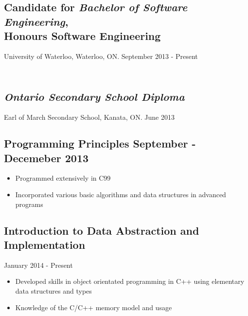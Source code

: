 \documentclass[11pt]{article}
\begin{document}
\begin{minipage}[t]{0.8\linewidth} 
	\subsection*{Candidate for \textit{Bachelor of Software Engineering}, \\ Honours Software Engineering} 								\vspace{-6pt}
		University of Waterloo, Waterloo, ON. \hspace{70pt} September 2013 - Present
	
	\subsection*{\textit{\\Ontario Secondary School Diploma}} \vspace{-6pt}
		Earl of March Secondary School, Kanata, ON. \hspace{100pt} June 2013\vspace{24pt}
		
	\subsection*{Programming Principles \hspace{95pt} \textnormal{September - Decemeber 2013}} \vspace{-6pt}
		\begin{itemize}
			\item Programmed extensively in C99
			\item Incorporated various basic algorithms and data structures in advanced programs
		\end{itemize}
		
	\subsection*{Introduction to Data Abstraction and Implementation}\vspace{-6pt} 
		\noindent \hfill January 2014 - Present
		\begin{itemize}
			\item Developed skills in object orientated programming in C++ using elementary data structures and 							types
			\item Knowledge of the C/C++ memory model and usage
		\end{itemize}
		

\end{minipage}
\end{document}
